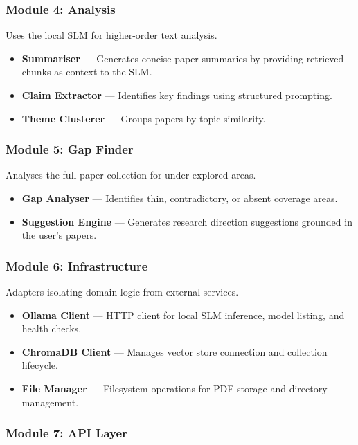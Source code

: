 \documentclass[12pt,a4paper]{article}
\begin{document}
\subsubsection{Module 4: Analysis}

Uses the local SLM for higher-order text analysis.
\begin{itemize}[leftmargin=2em]
    \item \textbf{Summariser} --- Generates concise paper summaries by
          providing retrieved chunks as context to the SLM.
    \item \textbf{Claim Extractor} --- Identifies key findings using
          structured prompting.
    \item \textbf{Theme Clusterer} --- Groups papers by topic similarity.
\end{itemize}

\subsubsection{Module 5: Gap Finder}

Analyses the full paper collection for under-explored areas.
\begin{itemize}[leftmargin=2em]
    \item \textbf{Gap Analyser} --- Identifies thin, contradictory, or
          absent coverage areas.
    \item \textbf{Suggestion Engine} --- Generates research direction
          suggestions grounded in the user's papers.
\end{itemize}

\subsubsection{Module 6: Infrastructure}

Adapters isolating domain logic from external services.
\begin{itemize}[leftmargin=2em]
    \item \textbf{Ollama Client} --- HTTP client for local SLM inference,
          model listing, and health checks.
    \item \textbf{ChromaDB Client} --- Manages vector store connection and
          collection lifecycle.
    \item \textbf{File Manager} --- Filesystem operations for PDF storage
          and directory management.
\end{itemize}

\subsubsection{Module 7: API Layer}
\end{document}

